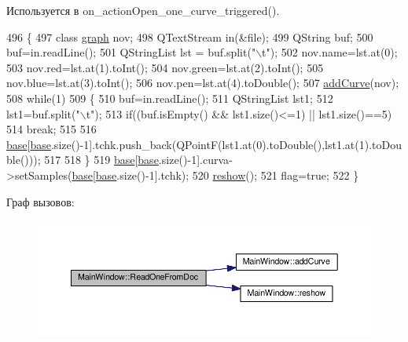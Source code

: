 Используется в on\+\_\+action\+Open\+\_\+one\+\_\+curve\+\_\+triggered().


\begin{DoxyCode}
496 \{
497     \textcolor{keyword}{class }\hyperlink{classgraph}{graph} nov;
498     QTextStream in(&file);
499     QString buf;
500     buf=in.readLine();
501     QStringList lst = buf.split(\textcolor{stringliteral}{"\(\backslash\)t"});
502     nov.name=lst.at(0);
503     nov.red=lst.at(1).toInt();
504     nov.green=lst.at(2).toInt();
505     nov.blue=lst.at(3).toInt();
506     nov.pen=lst.at(4).toDouble();
507     \hyperlink{class_main_window_aa5c0998b1192bfab3ff83b02c42b2c67}{addCurve}(nov);
508     \textcolor{keywordflow}{while}(1)
509     \{
510         buf=in.readLine();
511         QStringList lst1;
512         lst1=buf.split(\textcolor{stringliteral}{"\(\backslash\)t"});
513         \textcolor{keywordflow}{if}((buf.isEmpty() && lst1.size()<=1) || lst1.size()==5)
514             \textcolor{keywordflow}{break};
515 
516         \hyperlink{class_main_window_a3413d4508f4981518b1b8ebf3b29121e}{base}[\hyperlink{class_main_window_a3413d4508f4981518b1b8ebf3b29121e}{base}.size()-1].tchk.push\_back(QPointF(lst1.at(0).toDouble(),lst1.at(1).toDouble()));
517 
518     \}
519     \hyperlink{class_main_window_a3413d4508f4981518b1b8ebf3b29121e}{base}[\hyperlink{class_main_window_a3413d4508f4981518b1b8ebf3b29121e}{base}.size()-1].curva->setSamples(\hyperlink{class_main_window_a3413d4508f4981518b1b8ebf3b29121e}{base}[\hyperlink{class_main_window_a3413d4508f4981518b1b8ebf3b29121e}{base}.size()-1].tchk);
520     \hyperlink{class_main_window_a24985964bdf5f59467dcc99749e06bdd}{reshow}();
521     flag=\textcolor{keyword}{true};
522 \}
\end{DoxyCode}


Граф вызовов\+:\nopagebreak
\begin{figure}[H]
\begin{center}
\leavevmode
\includegraphics[width=350pt]{class_main_window_a72ec1547630d1af06f61888bb623fad6_cgraph}
\end{center}
\end{figure}




